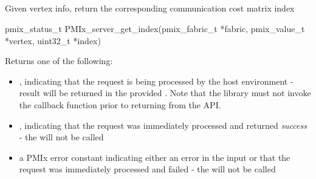 \descr


\subsection{}

\summary

Given vertex info, return the corresponding communication cost matrix index

\format

\cspecificstart
\begin{codepar}
pmix_status_t
PMIx_server_get_index(pmix_fabric_t *fabric,
                      pmix_value_t *vertex,
                      uint32_t *index)
\end{codepar}
\cspecificend

\begin{arglist}
\end{arglist}

\descr

Returns one of the following:

\begin{itemize}
    \item {}, indicating that the request is being processed by the host environment - result will be returned in the provided . Note that the library must not invoke the callback function prior to returning from the \ac{API}.
    \item {}, indicating that the request was immediately processed and returned \textit{success} - the  will not be called
    \item a \ac{PMIx} error constant indicating either an error in the input or that the request was immediately processed and failed - the  will not be called
\end{itemize}


\descr



